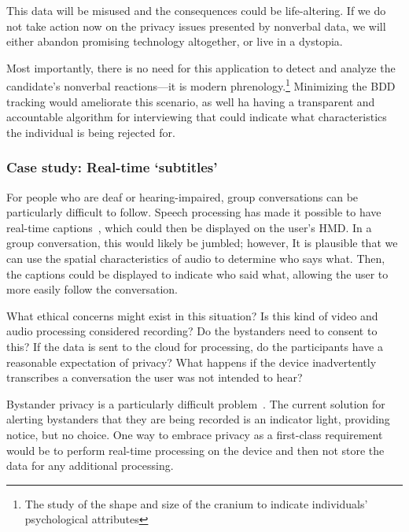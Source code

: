 This data will be misused and the consequences could be life-altering. If we do not take action now on the privacy issues presented by nonverbal data, we will either abandon promising technology altogether, or live in a dystopia.


Most importantly, there is no need for this application to detect and analyze the candidate's nonverbal reactions---it is modern phrenology.\footnote{The study of the shape and size of the cranium to indicate individuals' psychological attributes} Minimizing the BDD tracking would ameliorate this scenario, as well ha having a transparent and accountable algorithm for interviewing that could indicate what characteristics the individual is being rejected for.


\subsubsection{Case study: Real-time `subtitles'}

For people who are deaf or hearing-impaired, group conversations can be particularly difficult to follow. Speech processing has made it possible to have real-time captions~\cite{welch}, which could then be displayed on the user's HMD. In a group conversation, this would likely be jumbled; however, It is plausible that we can use the spatial characteristics of audio to determine who says what. Then, the captions could be displayed to indicate who said what, allowing the user to more easily follow the conversation.

What ethical concerns might exist in this situation? Is this kind of video and audio processing considered recording? Do the bystanders need to consent to this? If the data is sent to the cloud for processing, do the participants have a reasonable expectation of privacy? What happens if the device inadvertently transcribes a conversation the user was not intended to hear?

Bystander privacy is a particularly difficult problem~\cite{perez}. The current solution for alerting bystanders that they are being recorded is an indicator light, providing notice, but no choice. One way to embrace privacy as a first-class requirement would be to perform real-time processing on the device and then not store the data for any additional processing. %

